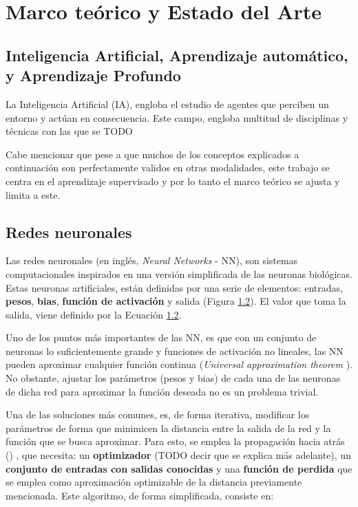 \section{Marco teórico y Estado del Arte}

\subsection{Inteligencia Artificial, Aprendizaje automático, y Aprendizaje Profundo}
La Inteligencia Artificial (IA), engloba el estudio de agentes que perciben un entorno y actúan en consecuencia. Este campo, engloba multitud de disciplinas y técnicas con las que se TODO

Cabe mencionar que pese a que muchos de los conceptos explicados a continuación son perfectamente validos en otras modalidades, este trabajo se centra en el aprendizaje supervisado y por lo tanto el marco teórico se ajusta y limita a este. 

\subsection{Redes neuronales}
Las redes neuronales (en inglés, \textit{Neural Networks} - NN), son sistemas computacionales inspirados en una versión simplificada de las neuronas biológicas. Estas neuronas artificiales, están definidas por una serie de elementos: entradas, \textbf{pesos}, \textbf{bias}, \textbf{función de activación} y salida (Figura \ref{}). El valor que toma la salida, viene definido por la Ecuación \ref{}.

Uno de los puntos más importantes de las NN, es que con un conjunto de neuronas lo suficientemente grande y funciones de activación no lineales, las NN pueden aproximar cualquier función continua (\textit{Universal approximation theorem} \cite{}). No obstante, ajustar los parámetros (pesos y bias) de cada una de las neuronas de dicha red para aproximar la función deseada no es un problema trivial. 

Una de las soluciones más comunes, es, de forma iterativa, modificar los parámetros de forma que minimicen la distancia entre la salida de la red y la función que se busca aproximar. Para esto, se emplea la propagación hacia atrás () \cite{}, que necesita: un \textbf{optimizador} (TODO decir que se explica más adelante), un \textbf{conjunto de entradas con salidas conocidas} y una \textbf{función de perdida} que se emplea como aproximación optimizable de la distancia previamente mencionada. Este algoritmo, de forma simplificada, consiste en:

